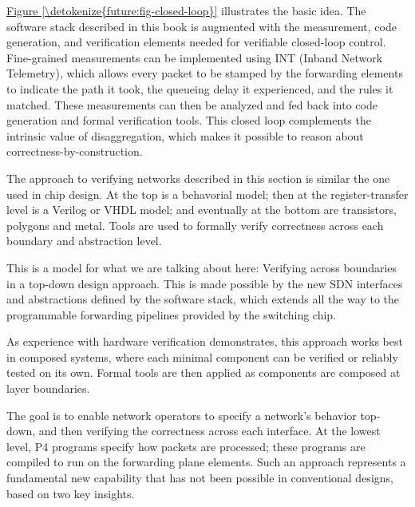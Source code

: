 \documentclass[letterpaper,11pt,english]{sphinxmanual}
\begin{document}
\hyperref[\detokenize{future:fig-closed-loop}]{Figure \ref{\detokenize{future:fig-closed-loop}}} illustrates the basic idea.  The
software stack described in this book is augmented with the
measurement, code generation, and verification elements needed for
verifiable closed-loop control. Fine-grained measurements can be
implemented using INT (Inband Network Telemetry), which allows every
packet to be stamped by the forwarding elements to indicate the path
it took, the queueing delay it experienced, and the rules it matched.
These measurements can then be analyzed and fed back into code
generation and formal verification tools. This closed loop complements
the intrinsic value of disaggregation, which makes it possible to
reason about correctness-by-construction.

\begin{sphinxShadowBox}

The approach to verifying networks described in this section is
similar the one used in chip design. At the top is a behavorial
model; then at the register-transfer level is a Verilog or VHDL
model; and eventually at the bottom are transistors, polygons and
metal. Tools are used to formally verify correctness across each
boundary and abstraction level.

This is a model for what we are talking about here: Verifying
across boundaries in a top-down design approach. This is made
possible by the new SDN interfaces and abstractions defined by the
software stack, which extends all the way to the programmable
forwarding pipelines provided by the switching chip.

As experience with hardware verification demonstrates, this
approach works best in composed systems, where each minimal
component can be verified or reliably tested on its own. Formal
tools are then applied as components are composed at layer
boundaries.
\end{sphinxShadowBox}

The goal is to enable network operators to specify a network’s
behavior top-down, and then verifying the correctness across each
interface. At the lowest level, P4 programs specify how packets are
processed; these programs are compiled to run on the forwarding plane
elements. Such an approach represents a fundamental new capability
that has not been possible in conventional designs, based on two key
insights.
\end{document}
